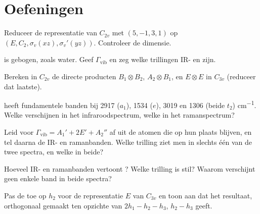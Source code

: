 \section{Oefeningen}

\begin{exercise}[$\star$]\label{exo:b3:group-theory-applied:1}
Reduceer de representatie van $C_{2v}$ met  $(5, -1, 3, 1)$ op $(E, C_2,
\sigma_v(xz), \sigma_v'(yz))$. Controleer de dimensie.
\end{exercise}

\begin{exercise}[$\star$]\label{exo:b3:group-theory-applied:2}
 is gebogen, zoals water. Geef $\Gamma_{\mathrm{vib}}$ en zeg welke
trillingen IR- en  zijn.
\end{exercise}

\begin{exercise}[$\star$]\label{exo:b3:group-theory-applied:3}
Bereken in $C_{2v}$ de directe producten $B_1\otimes B_2$, $A_2\otimes B_1$, en
$E\otimes E$ in $C_{3v}$ (reduceer dat laatste).
\end{exercise}

\begin{exercise}[$\star$]\label{exo:b3:group-theory-applied:4}
 heeft fundamentele banden bij 2917 ($a_1$), 1534 ($e$), 3019 en 1306 (beide $t_2$)
\unit{cm^{-1}}. Welke verschijnen in het infraroodspectrum, welke in het
ramanspectrum?
\end{exercise}

\begin{exercise}[$\star\star$]\label{exo:b3:group-theory-applied:5}
Leid voor  $\Gamma_{\mathrm{vib}} = A_1' + 2E' + A_2''$ af uit de atomen
die op hun plaats blijven, en tel daarna de IR- en ramanbanden. Welke
trilling ziet men in slechts één van de twee spectra, en welke in beide?
\end{exercise}

\begin{exercise}[$\star\star$]\label{exo:b3:group-theory-applied:6}
Hoeveel IR- en ramanbanden vertoont ? Welke trilling is stil? Waarom
verschijnt geen enkele band in beide spectra?
\end{exercise}

\begin{exercise}[$\star\star$]\label{exo:b3:group-theory-applied:7}
Pas de  toe op $h_2$ voor de representatie $E$ van $C_{3v}$ en
toon aan dat het resultaat, orthogonaal gemaakt ten opzichte van $2h_1 - h_2 - h_3$, $h_2 - h_3$ geeft.
\end{exercise}

